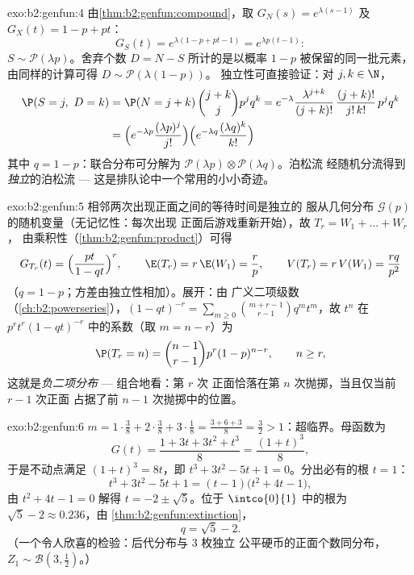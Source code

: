 \begin{solution}{exo:b2:genfun:4}
由\cref{thm:b2:genfun:compound}，取 $G_N(s) = e^{\lambda(s-1)}$
及 $G_X(t) = 1 - p + pt$：
\[
G_S(t) = e^{\lambda(1 - p + pt - 1)} = e^{\lambda p(t - 1)} :
\]
$S \sim \mathcal{P}(\lambda p)$。舍弃个数 $D = N - S$
所计的是以概率 $1 - p$ 被保留的同一批元素，
由同样的计算可得 $D \sim \mathcal{P}(\lambda(1 - p))$。
独立性可直接验证：对 $j, k \in \N$，
\begin{align*}
\P(S = j,\ D = k)
&= \P(N = j + k)\,\binom{j+k}{j}p^jq^k
= e^{-\lambda}\frac{\lambda^{j+k}}{(j+k)!}\,
\frac{(j+k)!}{j!\,k!}\,p^jq^k\\
&= \Bigl(e^{-\lambda p}\frac{(\lambda p)^j}{j!}\Bigr)
\Bigl(e^{-\lambda q}\frac{(\lambda q)^k}{k!}\Bigr)
\end{align*}
其中 $q = 1 - p$：联合分布可分解为
$\mathcal{P}(\lambda p) \otimes \mathcal{P}(\lambda q)$。泊松流
经随机分流得到\emph{独立}的泊松流 ---
这是排队论中一个常用的小小奇迹。
\end{solution}

\begin{solution}{exo:b2:genfun:5}
相邻两次出现正面之间的等待时间是独立的
服从几何分布 $\mathcal{G}(p)$ 的随机变量（无记忆性：每次出现
正面后游戏重新开始），故 $T_r = W_1 + \dots + W_r$，
由乘积性（\cref{thm:b2:genfun:product}）可得
\[
G_{T_r}(t) = \Bigl(\frac{pt}{1 - qt}\Bigr)^{r},
\qquad
\E(T_r) = r\,\E(W_1) = \frac rp,
\qquad
V(T_r) = r\,V(W_1) = \frac{rq}{p^2}
\]
（$q = 1 - p$；方差由独立性相加）。展开：由
广义二项级数
（\cref{ch:b2:powerseries}），$(1 - qt)^{-r} = \sum_{m\geq0}
\binom{m + r - 1}{r - 1}q^mt^m$，故 $t^n$ 在
$p^rt^r(1 - qt)^{-r}$ 中的系数（取 $m = n - r$）为
\[
\P(T_r = n) = \binom{n-1}{r-1}p^r(1-p)^{n-r},
\qquad n \geq r ,
\]
这就是\emph{负二项分布} --- 组合地看：第 $r$ 次
正面恰落在第 $n$ 次抛掷，当且仅当前 $r - 1$ 次正面
占据了前 $n - 1$ 次抛掷中的位置。
\end{solution}

\begin{solution}{exo:b2:genfun:6}
$m = 1\cdot\frac38 + 2\cdot\frac38 + 3\cdot\frac18 = \frac{3 + 6 +
3}{8} = \frac32 > 1$：超临界。母函数为
\[
G(t) = \frac{1 + 3t + 3t^2 + t^3}{8} = \frac{(1 + t)^3}{8} ,
\]
于是不动点满足 $(1 + t)^3 = 8t$，即 $t^3 + 3t^2 - 5t + 1
= 0$。分出必有的根 $t = 1$：
\[
t^3 + 3t^2 - 5t + 1 = (t - 1)\bigl(t^2 + 4t - 1\bigr),
\]
由 $t^2 + 4t - 1 = 0$ 解得 $t = -2 \pm \sqrt5$。位于
$\intco{0}{1}$ 中的根为 $\sqrt5 - 2 \approx 0.236$，由
\cref{thm:b2:genfun:extinction}，
\[
q = \sqrt 5 - 2 .
\]
（一个令人欣喜的检验：后代分布与 $3$ 枚独立
公平硬币的正面个数同分布，$Z_1 \sim \mathcal{B}(3, \frac12)$。）
\end{solution}

